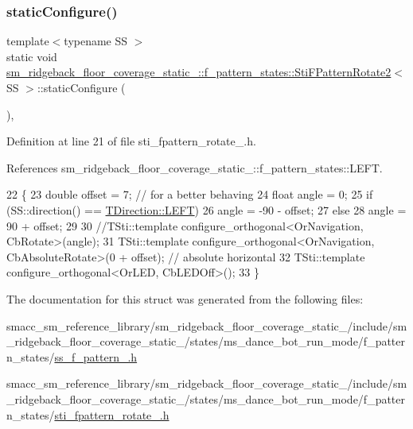 \subsubsection{\texorpdfstring{static\+Configure()}{staticConfigure()}}
{\footnotesize\ttfamily template$<$typename SS $>$ \\
static void \hyperlink{classsm__ridgeback__floor__coverage__static__1_1_1f__pattern__states_1_1StiFPatternRotate2}{sm\+\_\+ridgeback\+\_\+floor\+\_\+coverage\+\_\+static\+\_\+::f\+\_\+pattern\+\_\+states\+::\+Sti\+F\+Pattern\+Rotate2}$<$ SS $>$\+::static\+Configure (\begin{DoxyParamCaption}{ }\end{DoxyParamCaption})\hspace{0.3cm}{\ttfamily [inline]}, {\ttfamily [static]}}



Definition at line 21 of file sti\+\_\+fpattern\+\_\+rotate\+\_.\+h.



References sm\+\_\+ridgeback\+\_\+floor\+\_\+coverage\+\_\+static\+\_\+::f\+\_\+pattern\+\_\+states\+::\+L\+E\+FT.


\begin{DoxyCode}
22   \{
23     \textcolor{keywordtype}{double} offset = 7; \textcolor{comment}{// for a better behaving}
24     \textcolor{keywordtype}{float} angle = 0;
25     \textcolor{keywordflow}{if} (SS::direction() == \hyperlink{namespacesm__ridgeback__floor__coverage__static__1_1_1f__pattern__states_ad85e4f6b7cecf87bbe0eef96a899de72a684d325a7303f52e64011467ff5c5758}{TDirection::LEFT})
26       angle = -90 - offset;
27     \textcolor{keywordflow}{else}
28       angle = 90 + offset;
29 
30     \textcolor{comment}{//TSti::template configure\_orthogonal<OrNavigation, CbRotate>(angle);}
31     TSti::template configure\_orthogonal<OrNavigation, CbAbsoluteRotate>(0 + offset); \textcolor{comment}{// absolute horizontal}
32     TSti::template configure\_orthogonal<OrLED, CbLEDOff>();
33   \}
\end{DoxyCode}


The documentation for this struct was generated from the following files\+:\begin{DoxyCompactItemize}
\item 
smacc\+\_\+sm\+\_\+reference\+\_\+library/sm\+\_\+ridgeback\+\_\+floor\+\_\+coverage\+\_\+static\+\_/include/sm\+\_\+ridgeback\+\_\+floor\+\_\+coverage\+\_\+static\+\_/states/ms\+\_\+dance\+\_\+bot\+\_\+run\+\_\+mode/f\+\_\+pattern\+\_\+states/\hyperlink{sm__ridgeback__floor__coverage__static__1_2include_2sm__ridgeback__floor__coverage__static__1_2sef47342a2bdbaa835adb6637c605f7b6}{ss\+\_\+f\+\_\+pattern\+\_.\+h}\item 
smacc\+\_\+sm\+\_\+reference\+\_\+library/sm\+\_\+ridgeback\+\_\+floor\+\_\+coverage\+\_\+static\+\_/include/sm\+\_\+ridgeback\+\_\+floor\+\_\+coverage\+\_\+static\+\_/states/ms\+\_\+dance\+\_\+bot\+\_\+run\+\_\+mode/f\+\_\+pattern\+\_\+states/\hyperlink{sm__ridgeback__floor__coverage__static__1_2include_2sm__ridgeback__floor__coverage__static__1_2s2b4e3e377e9a102840a1e401ccd5baeb}{sti\+\_\+fpattern\+\_\+rotate\+\_.\+h}\end{DoxyCompactItemize}
